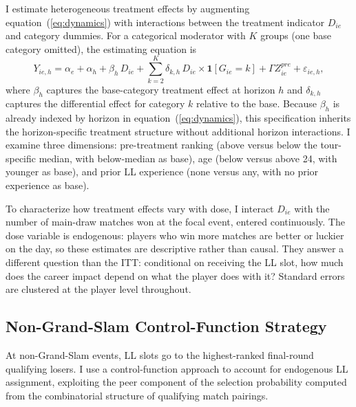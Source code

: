 I estimate heterogeneous treatment effects by augmenting equation~(\ref{eq:dynamics}) with interactions between the treatment indicator $D_{ie}$ and category dummies. For a categorical moderator with $K$ groups (one base category omitted), the estimating equation is
\begin{equation}
\label{eq:hetero}
Y_{ie,h} = \alpha_e + \alpha_h + \beta_h \, D_{ie} + \sum_{k=2}^{K} \delta_{k,h} \, D_{ie} \times \mathbf{1}[G_{ie} = k] + \Gamma Z^{pre}_{ie} + \varepsilon_{ie,h},
\end{equation}
where $\beta_h$ captures the base-category treatment effect at horizon $h$ and $\delta_{k,h}$ captures the differential effect for category $k$ relative to the base. Because $\beta_h$ is already indexed by horizon in equation~(\ref{eq:dynamics}), this specification inherits the horizon-specific treatment structure without additional horizon interactions. I examine three dimensions: pre-treatment ranking (above versus below the tour-specific median, with below-median as base), age (below versus above 24, with younger as base), and prior LL experience (none versus any, with no prior experience as base).

To characterize how treatment effects vary with dose, I interact $D_{ie}$ with the number of main-draw matches won at the focal event, entered continuously. The dose variable is endogenous: players who win more matches are better or luckier on the day, so these estimates are descriptive rather than causal. They answer a different question than the ITT: conditional on receiving the LL slot, how much does the career impact depend on what the player does with it? Standard errors are clustered at the player level throughout.

\subsection{Non-Grand-Slam Control-Function Strategy}
\label{sec:strategy_iv}

At non-Grand-Slam events, LL slots go to the highest-ranked final-round qualifying losers. I use a control-function approach to account for endogenous LL assignment, exploiting the peer component of the selection probability computed from the combinatorial structure of qualifying match pairings.

